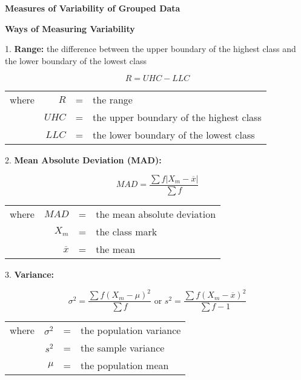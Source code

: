 \begin{center}
\textbf{Measures of Variability of Grouped Data}
\end{center}

\vspace*{1ex}

\textbf{Ways of Measuring Variability}

1. \textbf{Range:} the difference between the upper boundary of the highest class and the lower boundary of the lowest class

$$ R = UHC - LLC $$

\begin{center}
\begin{tabular}{rrcl}

where & $R$ & = & the range\\

& $UHC$ & = &the upper boundary of the highest class\\

& $LLC$ & = & the lower boundary of the lowest class\\

\end{tabular} 
\end{center} 


2. \textbf{Mean Absolute Deviation (MAD):} 

$$ MAD = \dfrac{\sum f| X_m - \overline{x}|}{\sum{f}} $$

\begin{center}
\begin{tabular}{rrcl}

where & $MAD$ & = & the mean absolute deviation \\
& $X_m$ & = & the class mark \\
& $\overline{x} $ & = & the mean\\
\end{tabular} 
\end{center} 


3. \textbf{Variance: } 

$$ \sigma^2 = \dfrac{\sum f(X_m - \mu)^2 }{\sum{f}} \text{ or } s^2 = \dfrac{\sum f(X_m - \overline{x})^2 }{\sum{f}-1} $$

\begin{center}
\begin{tabular}{rrcl}

where & $\sigma^2 $ & = & the population variance \\
& $s^2 $ & = & the sample variance\\
& $\mu$ & = & the population mean \\
\end{tabular} 
\end{center} 


